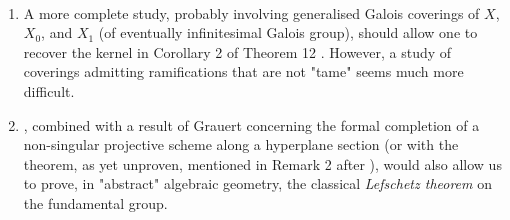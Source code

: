 \begin{remark}\label{fga2-8-remarks-ii}
    ~
    \begin{enumerate}
        \item A more complete study, probably involving generalised Galois coverings of $X$, $X_0$, and $X_1$ (of eventually infinitesimal Galois group), should allow one to recover the kernel in Corollary 2 of Theorem 12 .
              However, a study of coverings admitting ramifications that are not "tame" seems much more difficult.
        \item {}, combined with a result of Grauert concerning the formal completion of a non-singular projective scheme along a hyperplane section (or with the theorem, as yet unproven, mentioned in Remark 2 after ), would also allow us to prove, in "abstract" algebraic geometry, the classical \emph{Lefschetz theorem} on the fundamental group.
    \end{enumerate}
\end{remark}
